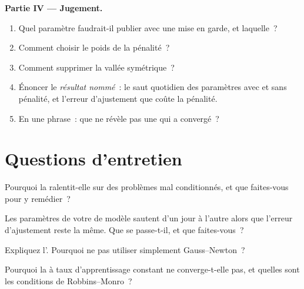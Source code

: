 \begin{problem}
\medskip\noindent\textbf{Partie IV --- Jugement.}
\begin{enumerate}[resume]
\item Quel paramètre faudrait-il publier avec une mise en garde, et laquelle~?
\item Comment choisir le poids de la pénalité~?
\item Comment supprimer la vallée symétrique~?
\item Énoncer le \emph{résultat nommé}~: le saut quotidien des paramètres avec et sans pénalité, et l'erreur d'ajustement que coûte la pénalité.
\item En une phrase~: que ne révèle pas une  qui a convergé~?
\end{enumerate}
\end{problem}

\section{Questions d'entretien}

\begin{interviewq}\label{iq:qm:numerical-optimisation-in-practice:1}
Pourquoi la  ralentit-elle sur des problèmes mal conditionnés, et que faites-vous pour y remédier~?
\end{interviewq}

\begin{interviewq}\label{iq:qm:numerical-optimisation-in-practice:2}
Les paramètres de votre  de modèle sautent d'un jour à l'autre alors que l'erreur d'ajustement reste la même. Que se passe-t-il, et que faites-vous~?
\end{interviewq}

\begin{interviewq}\label{iq:qm:numerical-optimisation-in-practice:3}
Expliquez l'. Pourquoi ne pas utiliser simplement Gauss--Newton~?
\end{interviewq}

\begin{interviewq}\label{iq:qm:numerical-optimisation-in-practice:4}
Pourquoi la  à taux d'apprentissage constant ne converge-t-elle pas, et quelles sont les conditions de Robbins--Monro~?
\end{interviewq}

